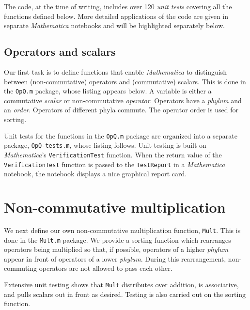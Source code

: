 \documentclass[12pt,letterpaper]{refart}
\begin{document}
The code, at the time of writing, includes over 120 \emph{unit tests} covering all the functions defined below.
More detailed applications of the code are given in separate \emph{Mathematica} notebooks and will be highlighted separately below.

\subsection{Operators and scalars}

Our first task is to define functions that enable \emph{Mathematica} to distinguish between (non-commutative) operators and (commutative) scalars. 
This is done in the \verb+OpQ.m+ package, whose listing appears below. 
A variable is either a commutative \emph{scalar} or non-commutative \emph{operator}.
Operators have a \emph{phylum} and an \emph{order}.
Operators of different phyla commute.
The operator order is used for sorting.



Unit tests for the functions in the \verb+OpQ.m+ package are organized into a separate package, \verb+OpQ-tests.m+, whose listing follows. 
Unit testing is built on \emph{Mathematica}'s \verb+VerificationTest+ function.
When the return value of the \verb+VerificationTest+ function is passed to the \verb+TestReport+ in a \emph{Mathematica} notebook, the notebook displays a nice graphical report card.



\section{Non-commutative multiplication}

We next define our own non-commutative multiplication function, \verb+Mult+.
This is done in the \verb+Mult.m+ package.
We provide a sorting function which rearranges operators being multiplied so that, if possible, operators of a higher \emph{phylum} appear in front of operators of a lower \emph{phylum}.
During this rearrangement, non-commuting operators are not allowed to pass each other.



Extensive unit testing shows that \verb+Mult+ distributes over addition, is associative, and pulls scalars out in front as desired.
Testing is also carried out on the sorting function.
\end{document}
